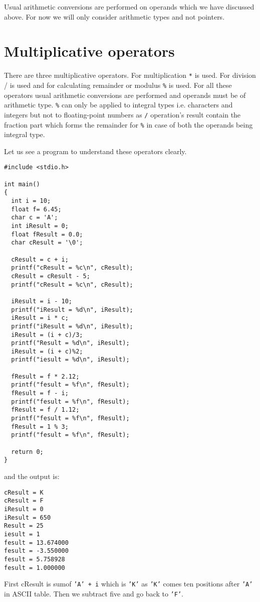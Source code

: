 Usual arithmetic conversions are performed on operands which we have discussed
above. For now we will only consider arithmetic types and not pointers.

\section{Multiplicative operators}
There are three multiplicative operators. For multiplication \texttt{*} is
used. For division / is used and for calculating remainder or modulus
\texttt{\%} is used. For all these operators usual arithmetic conversions are
performed and operands must be of arithmetic type. \texttt{\%} can only be
applied to integral types i.e. characters and integers but not to
floating-point numbers as \texttt{/} operation's result contain the fraction
part which forms the remainder for \texttt{\%} in case of both the operands
being integral type.

Let us see a program to understand these operators clearly.
\begin{Verbatim}[frame=single]
#include <stdio.h>

int main()
{
  int i = 10;
  float f= 6.45;
  char c = 'A';
  int iResult = 0;
  float fResult = 0.0;
  char cResult = '\0';

  cResult = c + i;
  printf("cResult = %c\n", cResult);
  cResult = cResult - 5;
  printf("cResult = %c\n", cResult);

  iResult = i - 10;
  printf("iResult = %d\n", iResult);
  iResult = i * c;
  printf("iResult = %d\n", iResult);
  iResult = (i + c)/3;
  printf("Result = %d\n", iResult);
  iResult = (i + c)%2;
  printf("iesult = %d\n", iResult);

  fResult = f * 2.12;
  printf("fesult = %f\n", fResult);
  fResult = f - i;
  printf("fesult = %f\n", fResult);  
  fResult = f / 1.12;
  printf("fesult = %f\n", fResult);
  fResult = 1 % 3;
  printf("fesult = %f\n", fResult);

  return 0;
}
\end{Verbatim}

and the output is:

\begin{Verbatim}
cResult = K
cResult = F
iResult = 0
iResult = 650
Result = 25
iesult = 1
fesult = 13.674000
fesult = -3.550000
fesult = 5.758928
fesult = 1.000000
\end{Verbatim}

First cResult is sumof \texttt{'A' + i} which is \texttt{'K'} as \texttt{'K'}
comes ten positions after \texttt{'A'} in ASCII table. Then we subtract five and
go back to \texttt{'F'}.

